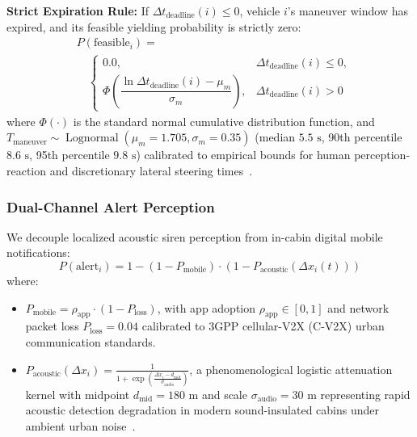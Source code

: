 \documentclass[journal,10pt,twocolumn]{IEEEtran}
\begin{document}
\textbf{Strict Expiration Rule:} If $\Delta t_{\text{deadline}}(i) \le 0$, vehicle $i$'s maneuver window has expired, and its feasible yielding probability is strictly zero:
\begin{equation}
\begin{aligned}
&P(\text{feasible}_i) = \\
&\quad \begin{cases} 
0.0, & \Delta t_{\text{deadline}}(i) \le 0, \\[5pt] 
\Phi\!\left( \dfrac{\ln \Delta t_{\text{deadline}}(i) - \mu_m}{\sigma_m} \right), & \Delta t_{\text{deadline}}(i) > 0 
\end{cases}
\end{aligned}
\end{equation}
where $\Phi(\cdot)$ is the standard normal cumulative distribution function, and $T_{\text{maneuver}} \sim \operatorname{Lognormal}(\mu_m = 1.705, \sigma_m = 0.35)$ (median $5.5\text{ s}$, 90th percentile $8.6\text{ s}$, 95th percentile $9.8\text{ s}$) calibrated to empirical bounds for human perception-reaction and discretionary lateral steering times~\cite{nhtsa2009}.

\subsubsection{Dual-Channel Alert Perception}
We decouple localized acoustic siren perception from in-cabin digital mobile notifications:
\begin{equation}
P(\text{alert}_i) = 1 - (1 - P_{\text{mobile}}) \cdot (1 - P_{\text{acoustic}}(\Delta x_i(t)))
\end{equation}
where:
\begin{itemize}
    \item $P_{\text{mobile}} = \rho_{\text{app}} \cdot (1 - P_{\text{loss}})$, with app adoption $\rho_{\text{app}} \in [0, 1]$ and network packet loss $P_{\text{loss}} = 0.04$ calibrated to 3GPP cellular-V2X (C-V2X) urban communication standards.
    \item $P_{\text{acoustic}}(\Delta x_i) = \frac{1}{1 + \exp\left( \frac{\Delta x_i - d_{\text{mid}}}{\sigma_{\text{audio}}} \right)}$, a phenomenological logistic attenuation kernel with midpoint $d_{\text{mid}} = 180\text{ m}$ and scale $\sigma_{\text{audio}} = 30\text{ m}$ representing rapid acoustic detection degradation in modern sound-insulated cabins under ambient urban noise~\cite{iso7731}.
\end{itemize}
\end{document}

